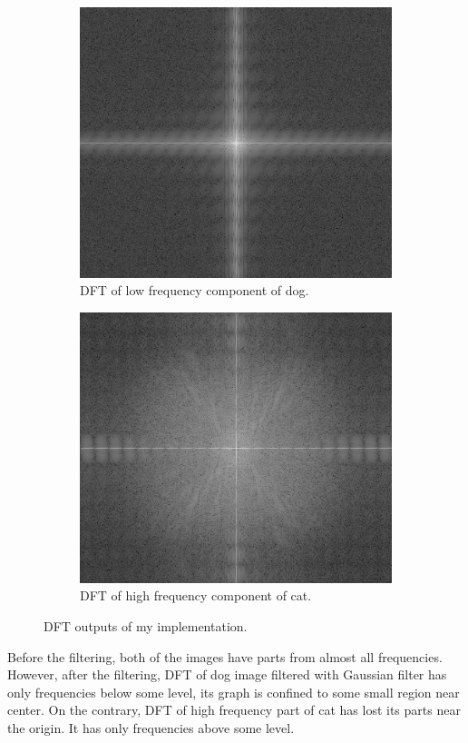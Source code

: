 \documentclass{article}
\begin{document}
\begin{figure}[!htb]
\begin{subfigure}{.5\textwidth}
  \includegraphics[width=.8\textwidth]{dog_filtered_DFT.jpg}
  \caption{DFT of low frequency component of dog.}
\end{subfigure}%
\begin{subfigure}{.5\textwidth}
  \centering
  \includegraphics[width=.8\textwidth]{cat_filtered_DFT.jpg}
  \caption{DFT of high frequency component of cat.}
\end{subfigure}
\caption{DFT outputs of my implementation.}
\end{figure}

Before the filtering, both of the images have parts from almost all frequencies. However, after the filtering, DFT of dog image filtered with Gaussian filter has only frequencies below some level, its graph is confined to some small region near center. On the contrary, DFT of high frequency part of cat has lost its parts near the origin. It has only frequencies above some level.
\end{document}
